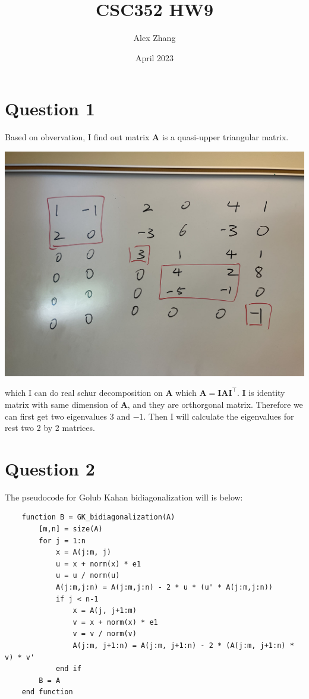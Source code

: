 \documentclass{article}
\title{CSC352 HW9}
\author{Alex Zhang}
\date{April 2023}
\newcommand{\mat}[1]{\mathbf{#1}}
\begin{document}
\maketitle
\section*{Question 1}
Based on obvervation, I find out matrix $\mat{A}$ is a quasi-upper triangular matrix.
\begin{center}
    \includegraphics[scale = 0.2]{quasi.jpg}
\end{center}
which I can do real schur decomposition on $\mat{A}$ which $\mat{A} = \mat{I}\mat{A}\mat{I}^\top$.
$\mat{I}$ is identity matrix with same dimension of $\mat{A}$, and they are orthorgonal matrix. Therefore we can first get 
two eigenvalues $3$ and $-1$. Then I will calculate the eigenvalues for rest two 2 by 2 matrices.


\section*{Question 2}
The pseudocode for Golub Kahan bidiagonalization will is below:

\begin{verbatim}
    function B = GK_bidiagonalization(A)
        [m,n] = size(A)
        for j = 1:n
            x = A(j:m, j)
            u = x + norm(x) * e1
            u = u / norm(u)
            A(j:m,j:n) = A(j:m,j:n) - 2 * u * (u' * A(j:m,j:n))
            if j < n-1
                x = A(j, j+1:m)
                v = x + norm(x) * e1
                v = v / norm(v)
                A(j:m, j+1:n) = A(j:m, j+1:n) - 2 * (A(j:m, j+1:n) * v) * v'
            end if    
        B = A
    end function
\end{verbatim}
\end{document}
